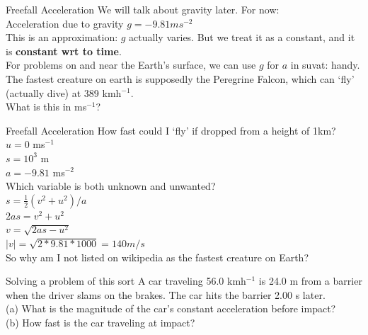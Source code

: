 \begin{frame}{Freefall Acceleration}
\small
We will talk about gravity later. For now: \\[1ex]

Acceleration due to gravity $g = -9.81 ms^{-2}$\\[1ex]

This is an approximation: $g$ actually varies. But we treat it as a constant, and it is \textbf{constant wrt to time}.\\[1ex]

For problems on and near the Earth's surface, we can use $g$ for $a$ in suvat: handy.\\[3ex]

The fastest creature on earth is supposedly the Peregrine Falcon, which can `fly' (actually dive) at 389 kmh$^{-1}$.\\[1ex]

What is this in ms$^{-1}$?\\[6ex]

\end{frame}



\begin{frame}{Freefall Acceleration}
\small
How fast could I `fly' if dropped from a height of 1km?\\

$u = 0$ ms$^{-1}$\\
$s = 10^3$ m\\
$a = -9.81$ ms$^{-2}$\\

Which variable is both unknown and unwanted?\\[2ex]

$s =  \frac{1}{2} (v^2 +u^2)/a$\\
$2as =  v^2 +u^2$\\
$v = \sqrt{2as - u^2}$\\
$|v| = \sqrt{2*9.81*1000} = 140 m/s$\\

So why am I not listed on wikipedia as the fastest creature on Earth?


\end{frame}






\begin{frame}{Solving a problem of this sort}
\small
A car traveling 56.0 kmh$^{-1}$ is 24.0 m from a barrier when the driver slams on the brakes. The car hits the barrier 2.00 s later. \\[1ex]

(a) What is the magnitude of the car's constant acceleration before impact? \\[10ex]
(b) How fast is the car traveling at impact?\\[6ex]
\end{frame}



